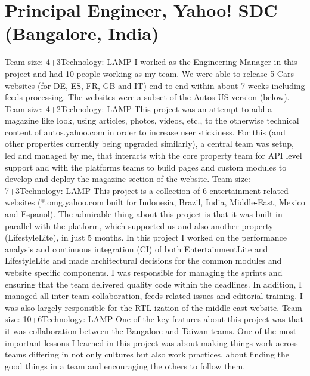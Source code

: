 \documentclass[11pt,a4paper,sans]{moderncv} %
\begin{document}
\section{Principal Engineer, Yahoo! SDC (Bangalore, India)}
         {Team size: 4+3}{Technology: LAMP}
         {I worked as the Engineering Manager in this project and had 10 people working as my team.
We were able to release 5 Cars websites (for DE, ES, FR, GB and IT) end-to-end within about 7
weeks including feeds processing. The websites were a subset of the Autos US version (below).}
         {Team size: 4+2}{Technology: LAMP}
         {This project was an attempt to add a magazine like look, using articles, photos, videos, etc., to
the otherwise technical content of autos.yahoo.com in order to increase user stickiness. For
this (and other properties currently being upgraded similarly), a central team was setup, led
and managed by me, that interacts with the core property team for API level support and with
the platforms teams to build pages and custom modules to develop and deploy the magazine
section of the website.}
         {Team size: 7+3}{Technology: LAMP}
         {This project is a collection of 6 entertainment related websites (*.omg.yahoo.com built for
Indonesia, Brazil, India, Middle-East, Mexico and Espanol). The admirable thing about this
project is that it was built in parallel with the platform, which supported us and also another
property (LifestyleLite), in just 5 months. In this project I worked on the performance
analysis and continuous integration (CI) of both EntertainmentLite and LifestyleLite and
made architectural decisions for the common modules and website specific components. I was
responsible for managing the sprints and ensuring that the team delivered quality code within
the deadlines. In addition, I managed all inter-team collaboration, feeds related issues and
editorial training. I was also largely responsible for the RTL-ization of the middle-east website.}
         {Team size: 10+6}{Technology: LAMP}
         {One of the key features about this project was that it was collaboration between the
Bangalore and Taiwan teams. One of the most important lessons I learned in this
project was about making things work across teams differing in not only cultures but also
work practices, about finding the good things in a team and encouraging the others to follow
them.}
\end{document}
